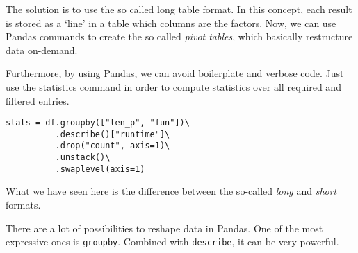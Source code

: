 The solution is to use the so called long table format.
In this concept, each result is stored as a `line'
in a table which columns are the factors.
Now, we can use Pandas commands to create the so called \emph{pivot tables},
which basically restructure data on-demand.

Furthermore, by using Pandas, we can avoid boilerplate and verbose code.
Just use the statistics command in order to compute statistics over all required
and filtered entries.


\begin{lstlisting}
stats = df.groupby(["len_p", "fun"])\
          .describe()["runtime"]\
          .drop("count", axis=1)\
          .unstack()\
          .swaplevel(axis=1)
\end{lstlisting}

What we have seen here is the difference between the so-called \emph{long}
and \emph{short} formats.

There are a lot of possibilities to reshape data in Pandas.
One of the most expressive ones is \texttt{groupby}.
Combined with \texttt{describe}, it can be very powerful.
